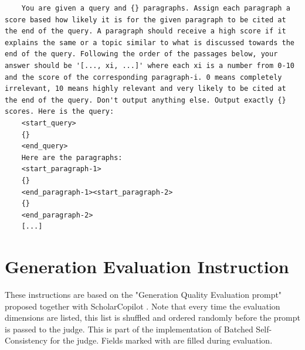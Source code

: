 \begin{lstlisting}
    You are given a query and {} paragraphs. Assign each paragraph a score based how likely it is for the given paragraph to be cited at the end of the query. A paragraph should receive a high score if it explains the same or a topic similar to what is discussed towards the end of the query. Following the order of the passages below, your answer should be '[..., xi, ...]' where each xi is a number from 0-10 and the score of the corresponding paragraph-i. 0 means completely irrelevant, 10 means highly relevant and very likely to be cited at the end of the query. Don't output anything else. Output exactly {} scores. Here is the query: 
    <start_query>
    {}
    <end_query>
    Here are the paragraphs: 
    <start_paragraph-1>
    {}
    <end_paragraph-1><start_paragraph-2>
    {}
    <end_paragraph-2>
    [...]
\end{lstlisting}

\section{Generation Evaluation Instruction}\label{generation-evaluation-instruction}
These instructions are based on the "Generation Quality Evaluation prompt" proposed together with ScholarCopilot \cite{wang2025scholarcopilot}. Note that every time the evaluation dimensions are listed, this list is shuffled and ordered randomly before the prompt is passed to the judge. This is part of the implementation of Batched Self-Consistency \cite{korikov2025batched} for the judge. Fields marked with \mono{\{\}} are filled during evaluation.

